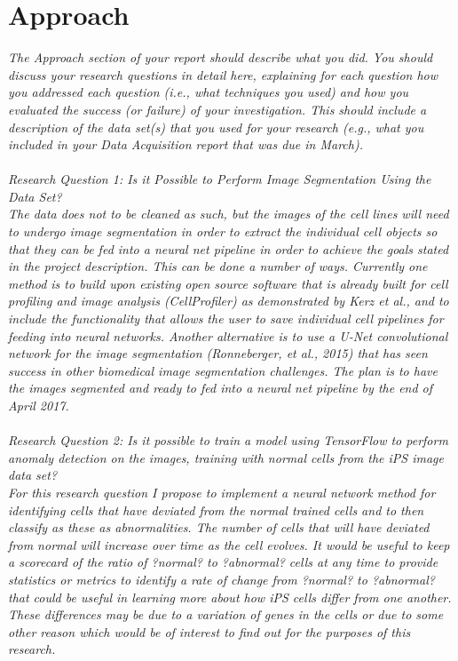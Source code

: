 \section{Approach} 

\emph{The Approach section of your report should describe what you did. You should discuss your research questions in detail here, explaining for each question how you addressed each question (i.e., what techniques you used) and how you evaluated the success (or failure) of your investigation. This should include a description of the data set(s) that you used for your research (e.g., what you included in your Data Acquisition report that was due in March). \\ \\ 
Research Question 1: Is it Possible to Perform Image Segmentation Using the Data Set? \\ The data does not to be cleaned as such, but the images of the cell lines will need to undergo image segmentation in order to extract the individual cell objects so that they can be fed into a neural net pipeline in order to achieve the goals stated in the project description. This can be done a number of ways. Currently one method is to build upon existing open source software that is already built for cell profiling and image analysis (CellProfiler) as demonstrated by Kerz et al., and to include the functionality that allows the user to save individual cell pipelines for feeding into neural networks. Another alternative is to use a U-Net convolutional network for the image segmentation (Ronneberger, et al., 2015) that has seen success in other biomedical image segmentation challenges. The plan is to have the images segmented and ready to fed into a neural net pipeline by the end of April 2017. \\ \\ 
Research Question 2: Is it possible to train a model using TensorFlow to perform anomaly detection on the images, training with normal cells from the iPS image data set? \\ 
For this research question I propose to implement a neural network method for identifying cells that have deviated from the normal trained cells and to then classify as these as abnormalities. The number of cells that will have deviated from normal will increase over time as the cell evolves. It would be useful to keep a scorecard of the ratio of ?normal? to ?abnormal? cells at any time to provide statistics or metrics to identify a rate of change from ?normal? to ?abnormal? that could be useful in learning more about how iPS cells differ from one another. These differences may be due to a variation of genes in the cells or due to some other reason which would be of interest to find out for the purposes of this research. \\ \\ 
}
